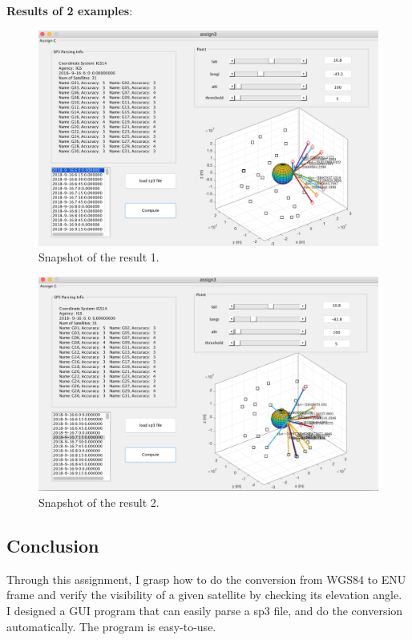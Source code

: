 \textbf{Results of 2 examples}: \\
\begin{figure}[h]
	\centering
	\includegraphics[width=\textwidth]{figures/ex3com1}
	\caption{Snapshot of the result 1.}
\end{figure}
\begin{figure}[h]
	\centering
	\includegraphics[width=\textwidth]{figures/ex3com2}
	\caption{Snapshot of the result 2.}
\end{figure}
\subsection{Conclusion}
Through this assignment, I grasp how to do the conversion from WGS84 to ENU frame and verify the visibility of a given satellite by checking its elevation angle. \\
I designed a GUI program that can easily parse a sp3 file, and do the conversion automatically. The program is easy-to-use.